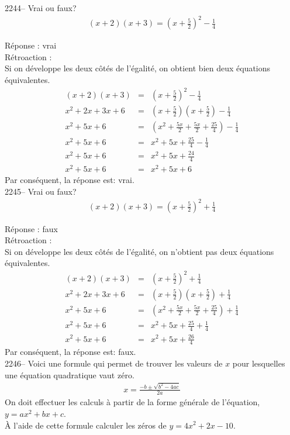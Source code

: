 \documentclass[letterpaper, 12pt]{article}
\begin{document}
2244-- Vrai ou faux?
\begin{eqnarray*}
 (x+2)(x+3) = \left( x+\frac{5}{2}\right)^{2}-\frac{1}{4}
\end{eqnarray*}

R\'eponse : vrai\\

R\'etroaction :\\
Si on d\'eveloppe les deux c\^ot\'es de l'\'egalit\'e, on obtient bien deux \'equations \'equivalentes.
\begin{eqnarray*}
 (x+2)(x+3) &=& \left( x+\frac{5}{2}\right)^{2}-\frac{1}{4}\\
 x^{2}+2x+3x+6 &=& \left( x+\frac{5}{2}\right)\left( x+\frac{5}{2}\right)-\frac{1}{4}\\
 x^{2}+5x+6 &=& \left( x^{2}+\frac{5x}{2}+\frac{5x}{2}+\frac{25}{4}\right)-\frac{1}{4}\\
 x^{2}+5x+6 &=& x^{2}+5x+\frac{25}{4}-\frac{1}{4}\\
 x^{2}+5x+6 &=& x^{2}+5x+\frac{24}{4}\\
 x^{2}+5x+6 &=& x^{2}+5x+6
\end{eqnarray*}
Par cons\'equent, la r\'eponse est: vrai.\\

2245--  Vrai ou faux?
\begin{eqnarray*}
 (x+2)(x+3) = \left( x+\frac{5}{2}\right)^{2}+\frac{1}{4}
\end{eqnarray*}

R\'eponse : faux\\

R\'etroaction :\\
Si on d\'eveloppe les deux c\^ot\'es de l'\'egalit\'e, on n'obtient pas deux \'equations \'equivalentes.
\begin{eqnarray*}
 (x+2)(x+3) &=& \left( x+\frac{5}{2}\right)^{2}+\frac{1}{4}\\
 x^{2}+2x+3x+6 &=& \left( x+\frac{5}{2}\right)\left( x+\frac{5}{2}\right)+\frac{1}{4}\\
 x^{2}+5x+6 &=& \left( x^{2}+\frac{5x}{2}+\frac{5x}{2}+\frac{25}{4}\right)+\frac{1}{4}\\
 x^{2}+5x+6 &=& x^{2}+5x+\frac{25}{4}+\frac{1}{4}\\
 x^{2}+5x+6 &=& x^{2}+5x+\frac{26}{4}
\end{eqnarray*}
Par cons\'equent, la r\'eponse est: faux.\\

2246-- Voici une formule qui permet de trouver les valeurs de $x$ pour lesquelles une \'equation quadratique vaut z\'ero.
\begin{eqnarray*}
 x=\frac{-b\pm\sqrt{b^{2}-4ac}}{2a}
\end{eqnarray*}
On doit effectuer les calculs \`a partir de la forme g\'en\'erale de l'\'equation, $y=ax^{2}+bx+c$.\\
\`A l'aide de cette formule calculer les z\'eros de $y=4x^{2}+2x-10$.\\
\end{document}
